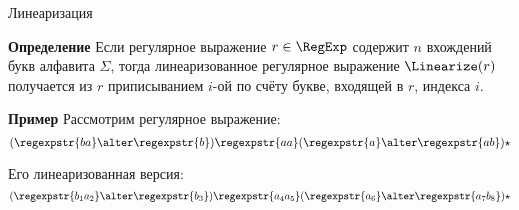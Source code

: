 \begin{frame}{Линеаризация}
  \begin{block}{\bf Определение}
    Если регулярное выражение $r\in\RegExp$ содержит $n$ вхождений букв алфавита $\Sigma$, тогда линеаризованное регулярное выражение $\Linearize(r)$ получается из $r$ приписыванием $i$-ой по счёту букве, входящей в $r$, индекса $i$.
  \end{block} %

  \begin{exampleblock}{\bf Пример}
    Рассмотрим регулярное выражение:
    \[(\regexpstr{ba}\alter \regexpstr{b})\regexpstr{aa}(\regexpstr{a}\alter\regexpstr{ab})\star\] %

    Его линеаризованная версия:
    \[(\regexpstr{b_{1}a_{2}}\alter \regexpstr{b_{3}})\regexpstr{a_{4}a_{5}}(\regexpstr{a_{6}}\alter\regexpstr{a_{7}b_{8}})\star\] %

  \end{exampleblock}

\end{frame}